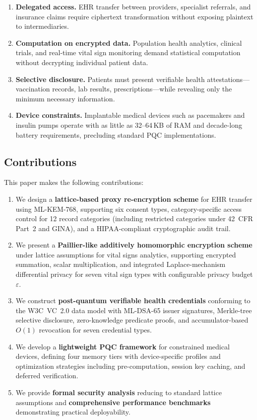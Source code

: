 \documentclass[conference,10pt]{IEEEtran}
\newcommand{\mlkem}{\textsf{ML-KEM}}
\newcommand{\mldsa}{\textsf{ML-DSA}}
\begin{document}
\begin{enumerate}[leftmargin=*]
    \item \textbf{Delegated access.} EHR transfer between providers, specialist referrals, and insurance claims require ciphertext transformation without exposing plaintext to intermediaries.
    \item \textbf{Computation on encrypted data.} Population health analytics, clinical trials, and real-time vital sign monitoring demand statistical computation without decrypting individual patient data.
    \item \textbf{Selective disclosure.} Patients must present verifiable health attestations---vaccination records, lab results, prescriptions---while revealing only the minimum necessary information.
    \item \textbf{Device constraints.} Implantable medical devices such as pacemakers and insulin pumps operate with as little as 32--64\,KB of RAM and decade-long battery requirements, precluding standard PQC implementations.
\end{enumerate}

\subsection{Contributions}

This paper makes the following contributions:

\begin{enumerate}[leftmargin=*]
    \item We design a \textbf{lattice-based proxy re-encryption scheme} for EHR transfer using \mlkem{}-768, supporting six consent types, category-specific access control for 12 record categories (including restricted categories under 42~CFR Part~2 and GINA), and a HIPAA-compliant cryptographic audit trail.

    \item We present a \textbf{Paillier-like additively homomorphic encryption scheme} under lattice assumptions for vital signs analytics, supporting encrypted summation, scalar multiplication, and integrated Laplace-mechanism differential privacy for seven vital sign types with configurable privacy budget $\varepsilon$.

    \item We construct \textbf{post-quantum verifiable health credentials} conforming to the W3C~VC~2.0 data model with \mldsa{}-65 issuer signatures, Merkle-tree selective disclosure, zero-knowledge predicate proofs, and accumulator-based $O(1)$ revocation for seven credential types.

    \item We develop a \textbf{lightweight PQC framework} for constrained medical devices, defining four memory tiers with device-specific profiles and optimization strategies including pre-computation, session key caching, and deferred verification.

    \item We provide \textbf{formal security analysis} reducing to standard lattice assumptions and \textbf{comprehensive performance benchmarks} demonstrating practical deployability.
\end{enumerate}
\end{document}
